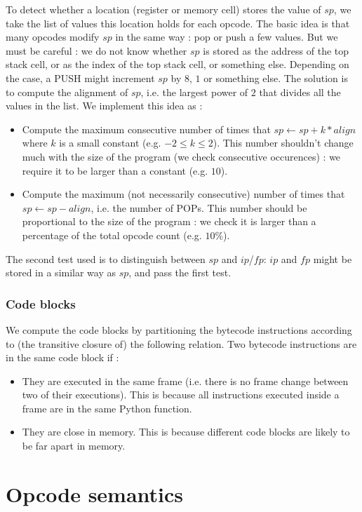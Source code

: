 \documentclass[english]{article}
\begin{document}
To detect whether a location (register or memory cell) stores the value of $sp$, we take the list of values this location holds for each opcode. The basic idea is that many opcodes modify $sp$ in the same way : pop or push a few values. But we must be careful : we do not know whether $sp$ is stored as the address of the top stack cell, or as the index of the top stack cell, or something else. Depending on the case, a PUSH might increment $sp$ by $8$, $1$ or something else. The solution is to compute the alignment of $sp$, i.e. the largest power of $2$ that divides all the values in the list. We implement this idea as :
\begin{itemize}
	\item Compute the maximum consecutive number of times that $sp \leftarrow sp + k*align$ where $k$ is a small constant (e.g. $-2 \leq k \leq 2$). This number shouldn't change much with the size of the program (we check consecutive occurences) : we require it to be larger than a constant (e.g. $10$).
	\item Compute the maximum (not necessarily consecutive) number of times that $sp \leftarrow sp - align$, i.e. the number of POPs. This number should be proportional to the size of the program : we check it is larger than a percentage of the total opcode count (e.g. $10\%$).
\end{itemize}
The second test used is to distinguish between $sp$ and $ip$/$fp$: $ip$ and $fp$ might be stored in a similar way as $sp$, and pass the first test. 

\subsubsection{Code blocks}

We compute the code blocks by partitioning the bytecode instructions according to (the transitive closure of) the following relation. Two bytecode instructions are in the same code block if :
\begin{itemize}
	\item They are executed in the same frame (i.e. there is no frame change between two of their executions). This is because all instructions executed inside a frame are in the same Python function.
	\item They are close in memory. This is because different code blocks are likely to be far apart in memory. %
\end{itemize}


\section{Opcode semantics}
\end{document}
